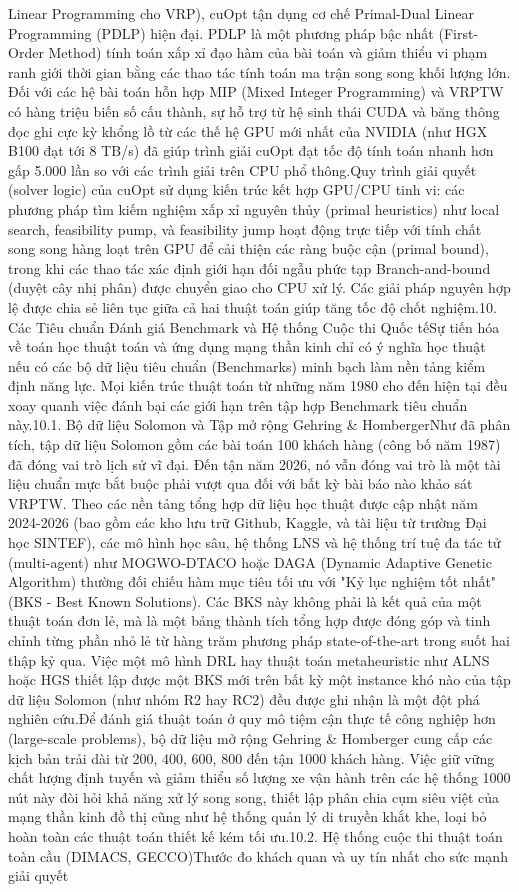 \documentclass[13pt, a4paper]{extarticle} %
\begin{document}
Linear Programming cho VRP), cuOpt tận dụng cơ chế Primal-Dual Linear Programming (PDLP) hiện đại. PDLP là một phương pháp bậc nhất (First-Order Method) tính toán xấp xỉ đạo hàm của bài toán và giảm thiểu vi phạm ranh giới thời gian bằng các thao tác tính toán ma trận song song khối lượng lớn. Đối với các hệ bài toán hỗn hợp MIP (Mixed Integer Programming) và VRPTW có hàng triệu biến số cấu thành, sự hỗ trợ từ hệ sinh thái CUDA và băng thông đọc ghi cực kỳ khổng lồ từ các thế hệ GPU mới nhất của NVIDIA (như HGX B100 đạt tới 8 TB/s) đã giúp trình giải cuOpt đạt tốc độ tính toán nhanh hơn gấp 5.000 lần so với các trình giải trên CPU phổ thông.Quy trình giải quyết (solver logic) của cuOpt sử dụng kiến trúc kết hợp GPU/CPU tinh vi: các phương pháp tìm kiếm nghiệm xấp xỉ nguyên thủy (primal heuristics) như local search, feasibility pump, và feasibility jump hoạt động trực tiếp với tính chất song song hàng loạt trên GPU để cải thiện các ràng buộc cận (primal bound), trong khi các thao tác xác định giới hạn đối ngẫu phức tạp Branch-and-bound (duyệt cây nhị phân) được chuyển giao cho CPU xử lý. Các giải pháp nguyên hợp lệ được chia sẻ liên tục giữa cả hai thuật toán giúp tăng tốc độ chốt nghiệm.10. Các Tiêu chuẩn Đánh giá Benchmark và Hệ thống Cuộc thi Quốc tếSự tiến hóa về toán học thuật toán và ứng dụng mạng thần kinh chỉ có ý nghĩa học thuật nếu có các bộ dữ liệu tiêu chuẩn (Benchmarks) minh bạch làm nền tảng kiểm định năng lực. Mọi kiến trúc thuật toán từ những năm 1980 cho đến hiện tại đều xoay quanh việc đánh bại các giới hạn trên tập hợp Benchmark tiêu chuẩn này.10.1. Bộ dữ liệu Solomon và Tập mở rộng Gehring & HombergerNhư đã phân tích, tập dữ liệu Solomon gồm các bài toán 100 khách hàng (công bố năm 1987) đã đóng vai trò lịch sử vĩ đại. Đến tận năm 2026, nó vẫn đóng vai trò là một tài liệu chuẩn mực bắt buộc phải vượt qua đối với bất kỳ bài báo nào khảo sát VRPTW. Theo các nền tảng tổng hợp dữ liệu học thuật được cập nhật năm 2024-2026 (bao gồm các kho lưu trữ Github, Kaggle, và tài liệu từ trường Đại học SINTEF), các mô hình học sâu, hệ thống LNS và hệ thống trí tuệ đa tác tử (multi-agent) như MOGWO-DTACO hoặc DAGA (Dynamic Adaptive Genetic Algorithm) thường đối chiếu hàm mục tiêu tối ưu với "Kỷ lục nghiệm tốt nhất" (BKS - Best Known Solutions). Các BKS này không phải là kết quả của một thuật toán đơn lẻ, mà là một bảng thành tích tổng hợp được đóng góp và tinh chỉnh từng phần nhỏ lẻ từ hàng trăm phương pháp state-of-the-art trong suốt hai thập kỷ qua. Việc một mô hình DRL hay thuật toán metaheuristic như ALNS hoặc HGS thiết lập được một BKS mới trên bất kỳ một instance khó nào của tập dữ liệu Solomon (như nhóm R2 hay RC2) đều được ghi nhận là một đột phá nghiên cứu.Để đánh giá thuật toán ở quy mô tiệm cận thực tế công nghiệp hơn (large-scale problems), bộ dữ liệu mở rộng Gehring & Homberger cung cấp các kịch bản trải dài từ 200, 400, 600, 800 đến tận 1000 khách hàng. Việc giữ vững chất lượng định tuyến và giảm thiểu số lượng xe vận hành trên các hệ thống 1000 nút này đòi hỏi khả năng xử lý song song, thiết lập phân chia cụm siêu việt của mạng thần kinh đồ thị cũng như hệ thống quản lý di truyền khắt khe, loại bỏ hoàn toàn các thuật toán thiết kế kém tối ưu.10.2. Hệ thống cuộc thi thuật toán toàn cầu (DIMACS, GECCO)Thước đo khách quan và uy tín nhất cho sức mạnh giải quyết 
\end{document}
